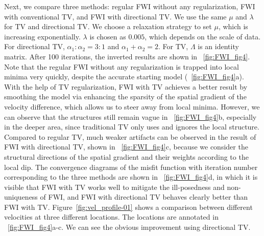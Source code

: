 Next, we compare three methods: regular FWI without any regularization, FWI with conventional TV, and FWI with directional TV. We use the same $\mu$ and $\lambda$ for TV and directional TV. We choose a relaxation strategy to set $\mu$, which is increasing exponentially. $\lambda$ is chosen as $0.005$, which depends on the scale of data. For directional TV, $\alpha_1 : \alpha_2 = 3 : 1$ and $\alpha_1 + \alpha_2 = 2$. For TV, $\Lambda$ is an identity matrix. After 100 iterations, the inverted results are shown in ~\ref{fig:FWI_fig4}. Note that the regular FWI without any regularization is trapped into local minima very quickly, despite the accurate starting model (~\ref{fig:FWI_fig4}a). With the help of TV regularization, FWI with TV achieves a better result by smoothing the model via enhancing the sparsity of the spatial gradient of the velocity difference, which allows us to steer away from local minima. However, we can observe that the structures still remain vague in ~\ref{fig:FWI_fig4}b, especially in the deeper area, since traditional TV only uses  and ignores the local structure. Compared to  regular TV, much weaker artifacts can be observed in the result of FWI with  directional TV, shown in ~\ref{fig:FWI_fig4}c, because we consider the structural directions of the spatial gradient and their weights according to the local dip. The convergence diagrams of the misfit function with iteration number corresponding to the three methods are shown in ~\ref{fig:FWI_fig4}d, in which it is visible that FWI with TV works well to mitigate the ill-posedness and non-uniqueness of FWI, and FWI with directional TV behaves clearly better than FWI with  TV. Figure~\ref{fig:vel_profile-01} shows a comparison between  different velocities at three different locations. The locations are annotated in ~\ref{fig:FWI_fig4}a-c. We can see the obvious improvement using directional TV. 

